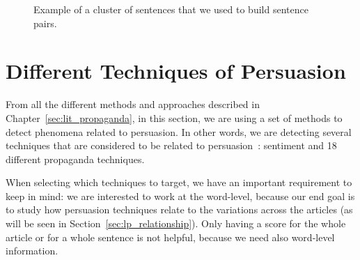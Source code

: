 \begin{figure}[!htbp]
    \centering
    \caption{Example of a cluster of sentences that we used to build sentence pairs.}
    \label{fig:raw_clique_data}
\end{figure}






\section{Different Techniques of Persuasion}
\label{sec:lp_techniques}


From all the different methods and approaches described in Chapter~\ref{sec:lit_propaganda}, in this section, we are using a set of methods to detect phenomena related to persuasion. %
In other words, we are detecting several techniques that are considered 
to be related to persuasion~\citep{gass2018persuasion}: sentiment and 18 different propaganda techniques.%


When selecting which techniques to target, we have an important requirement to keep in mind: we are interested to work at the word-level, because our end goal is to study how persuasion techniques relate to the variations across the articles (as will be seen in Section~\ref{sec:lp_relationship}). Only having a score for the whole article or for a whole sentence is not helpful, because we need also word-level information.

